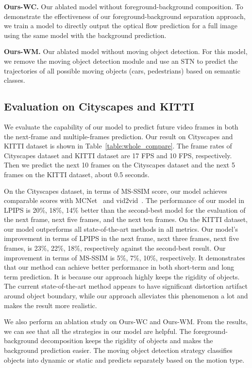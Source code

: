 \documentclass[10pt,twocolumn,letterpaper]{article}
\begin{document}
\vspace{2mm}
\noindent \textbf{Ours-WC.} Our ablated model without foreground-background composition. To demonstrate the effectiveness of our foreground-background separation approach, we train a model to directly output the optical flow prediction for a full image using the same model with the background prediction.

\vspace{2mm}
\noindent \textbf{Ours-WM.} Our ablated model without moving object detection. For this model, we remove the moving object detection module and use an STN to predict the trajectories of all possible moving objects (cars, pedestrians) based on semantic classes.




\subsection{Evaluation on Cityscapes and KITTI}
We evaluate the capability of our model to predict future video frames in both the next-frame and multiple-frames prediction. Our result on Cityscapes and KITTI dataset is shown in Table~\ref{table:whole_compare}. The frame rates of Cityscapes dataset and KITTI dataset are 17 FPS and 10 FPS, respectively. Then we predict the next 10 frames on the Cityscapes dataset and the next 5 frames on the KITTI dataset, about 0.5 seconds.

On the Cityscapes dataset, in terms of MS-SSIM score, our model achieves comparable scores with MCNet~\cite{villegas17mcnet} and vid2vid~\cite{Wang2018}. The performance of our model in LPIPS is 20\%, 18\%, 14\% better than the second-best model for the evaluation of the next frame, next five frames, and the next ten frames. On the KITTI dataset, our model outperforms all state-of-the-art methods in all metrics. Our model's improvement in terms of LPIPS in the next frame, next three frames, next five frames, is 23\%, 22\%, 18\%, respectively against the second-best result. Our improvement in terms of MS-SSIM is 5\%, 7\%, 10\%, respectively.
It demonstrates that our method can achieve better performance in both short-term and long term prediction. It is because our approach highly keeps the rigidity of objects. The current state-of-the-art method appears to have significant distortion artifact around object boundary, while our approach alleviates this phenomenon a lot and makes the result more realistic.  


We also perform an ablation study on Ours-WC and Ours-WM. From the results, we can see that all the strategies in our model are helpful. The foreground-background decomposition keeps the rigidity of objects and makes the background prediction easier. The moving object detection strategy classifies objects into dynamic or static and predicts separately based on the motion type.
\end{document}
